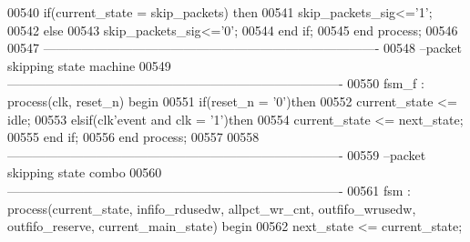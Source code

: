 \begin{DoxyCode}
00540     \textcolor{keywordflow}{if}\textcolor{vhdlchar}{(}\textcolor{vhdlchar}{current_state} \textcolor{vhdlchar}{=} \textcolor{vhdlchar}{skip\_packets}\textcolor{vhdlchar}{)} \textcolor{keywordflow}{then}
00541         \textcolor{vhdlchar}{skip_packets_sig}\textcolor{vhdlchar}{<=}\textcolor{vhdlchar}{'}\textcolor{vhdllogic}{}\textcolor{vhdllogic}{1}\textcolor{vhdlchar}{'};
00542     \textcolor{keywordflow}{else}
00543         \textcolor{vhdlchar}{skip_packets_sig}\textcolor{vhdlchar}{<=}\textcolor{vhdlchar}{'}\textcolor{vhdllogic}{}\textcolor{vhdllogic}{0}\textcolor{vhdlchar}{'};
00544     \textcolor{keywordflow}{end} \textcolor{keywordflow}{if};
00545 \textcolor{keywordflow}{end} \textcolor{keywordflow}{process};
00546 
00547 \textcolor{keyword}{-------------------------------------------------------------------------------}
00548 \textcolor{keyword}{--packet skipping state machine}
00549 \textcolor{keyword}{-------------------------------------------------------------------------------}
00550 fsm\_f : \textcolor{keywordflow}{process}(clk, reset_n) \textcolor{keywordflow}{begin}
00551     \textcolor{keywordflow}{if}\textcolor{vhdlchar}{(}\textcolor{vhdlchar}{reset_n} \textcolor{vhdlchar}{=} \textcolor{vhdlchar}{'}\textcolor{vhdllogic}{}\textcolor{vhdllogic}{0}\textcolor{vhdlchar}{'}\textcolor{vhdlchar}{)}\textcolor{keywordflow}{then}
00552         \textcolor{vhdlchar}{current_state} \textcolor{vhdlchar}{<=} \textcolor{vhdlchar}{idle};
00553     \textcolor{keywordflow}{elsif}\textcolor{vhdlchar}{(}\textcolor{vhdlchar}{clk}\textcolor{vhdlchar}{'}\textcolor{vhdlkeyword}{event} \textcolor{keywordflow}{and} \textcolor{vhdlchar}{clk} \textcolor{vhdlchar}{=} \textcolor{vhdlchar}{'}\textcolor{vhdllogic}{}\textcolor{vhdllogic}{1}\textcolor{vhdlchar}{'}\textcolor{vhdlchar}{)}\textcolor{keywordflow}{then} 
00554         \textcolor{vhdlchar}{current_state} \textcolor{vhdlchar}{<=} \textcolor{vhdlchar}{next_state};
00555     \textcolor{keywordflow}{end} \textcolor{keywordflow}{if}; 
00556 \textcolor{keywordflow}{end} \textcolor{keywordflow}{process};
00557 
00558 \textcolor{keyword}{-------------------------------------------------------------------------------}
00559 \textcolor{keyword}{--packet skipping state combo}
00560 \textcolor{keyword}{-------------------------------------------------------------------------------}
00561 fsm : \textcolor{keywordflow}{process}(current_state, infifo_rdusedw, allpct_wr_cnt, outfifo_wrusedw, 
      outfifo_reserve, current_main_state) \textcolor{keywordflow}{begin}
00562     \textcolor{vhdlchar}{next_state} \textcolor{vhdlchar}{<=} \textcolor{vhdlchar}{current_state};

\end{DoxyCode}
